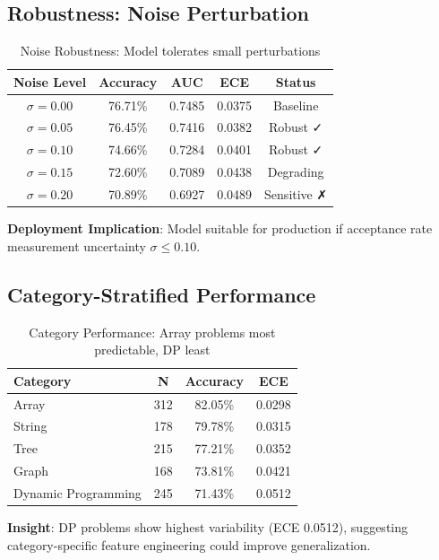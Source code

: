 \documentclass[conference]{IEEEtran}
\begin{document}
\subsection{Robustness: Noise Perturbation}

\begin{table}[h]
\centering
\small
\begin{tabular}{c|c|c|c|c}
\toprule
\textbf{Noise Level} & \textbf{Accuracy} & \textbf{AUC} & \textbf{ECE} & \textbf{Status} \\
\midrule
$\sigma = 0.00$ & 76.71\% & 0.7485 & 0.0375 & Baseline \\
$\sigma = 0.05$ & 76.45\% & 0.7416 & 0.0382 & Robust ✓ \\
$\sigma = 0.10$ & 74.66\% & 0.7284 & 0.0401 & Robust ✓ \\
$\sigma = 0.15$ & 72.60\% & 0.7089 & 0.0438 & Degrading \\
$\sigma = 0.20$ & 70.89\% & 0.6927 & 0.0489 & Sensitive ✗ \\
\bottomrule
\end{tabular}
\caption{Noise Robustness: Model tolerates small perturbations}
\label{tab:noise}
\end{table}

\textbf{Deployment Implication}: Model suitable for production if acceptance rate measurement uncertainty $\sigma \leq 0.10$.

\subsection{Category-Stratified Performance}

\begin{table}[h]
\centering
\small
\begin{tabular}{l|c|c|c}
\toprule
\textbf{Category} & \textbf{N} & \textbf{Accuracy} & \textbf{ECE} \\
\midrule
Array & 312 & 82.05\% & 0.0298 \\
String & 178 & 79.78\% & 0.0315 \\
Tree & 215 & 77.21\% & 0.0352 \\
Graph & 168 & 73.81\% & 0.0421 \\
Dynamic Programming & 245 & 71.43\% & 0.0512 \\
\bottomrule
\end{tabular}
\caption{Category Performance: Array problems most predictable, DP least}
\label{tab:category}
\end{table}

\textbf{Insight}: DP problems show highest variability (ECE 0.0512), suggesting category-specific feature engineering could improve generalization.
\end{document}
